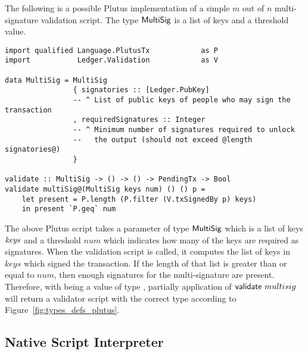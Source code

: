\documentclass[11pt,a4paper,dvipsnames]{article}
\theoremstyle{definition}
\begin{document}
The following is a possible Plutus implementation of a simple $m$ out of $n$
multi-signature validation script. The type $\mathsf{MultiSig}$ is a list of keys
and a threshold value.

\begin{verbatim}
import qualified Language.PlutusTx            as P
import           Ledger.Validation            as V

data MultiSig = MultiSig
                { signatories :: [Ledger.PubKey]
                -- ^ List of public keys of people who may sign the transaction
                , requiredSignatures :: Integer
                -- ^ Minimum number of signatures required to unlock
                --   the output (should not exceed @length signatories@)
                }

validate :: MultiSig -> () -> () -> PendingTx -> Bool
validate multiSig@(MultiSig keys num) () () p =
    let present = P.length (P.filter (V.txSignedBy p) keys)
    in present `P.geq` num
\end{verbatim}

The above Plutus script takes a parameter  of type
$\mathsf{MultiSig}$ which is a list of keys $\mathit{keys}$ and a threshold $num$
which indicates how many of the keys are required as signatures. When the
validation script is called, it computes the list of keys in $keys$ which signed
the transaction. If the length of that list is greater than or equal to $num$,
then enough signatures for the multi-signature are present. Therefore, with
 being a value of type , partially application of
$\mathsf{validate}~multisig$ will return a validator script with the correct type
according to Figure~\ref{fig:types_defs_plutus}.

\subsection{Native Script Interpreter}
\label{sec:native-script-interp}
\end{document}
